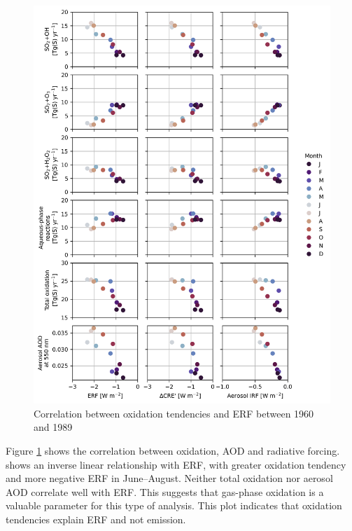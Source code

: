 \begin{figure}
    \centering
    \includegraphics[width=\linewidth]{Chapter4/Figs/seasonal_oxidation_erf_corr_pothole.png}
    \caption[Correlation between  oxidation tendencies and ERF between 1960 and 1989]{Correlation between  oxidation tendencies and ERF between 1960 and 1989}
    \label{fig:ch4:seasonal-erf-corr}
\end{figure}

Figure \ref{fig:ch4:seasonal-erf-corr} shows the correlation between oxidation, AOD and radiative forcing.  shows an inverse linear relationship with ERF, with greater oxidation tendency and more negative ERF in June--August. Neither total oxidation nor aerosol AOD correlate well with ERF. This suggests that gas-phase oxidation is a valuable parameter for this type of analysis. This plot indicates that oxidation tendencies explain ERF and not emission.



